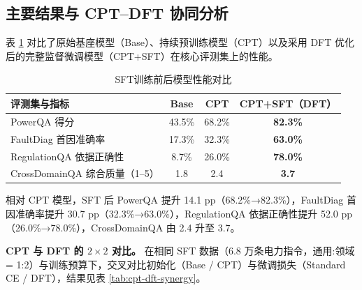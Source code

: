 \documentclass[fontset=fandol,type=master,campus=shenzhen,etitleauto=true]{hithesisbook}
\begin{document}
\subsection{主要结果与 CPT--DFT 协同分析}\label{ux4e3bux8981ux7ed3ux679c-2}

表 \ref{tab:sft-results} 对比了原始基座模型（Base）、持续预训练模型（CPT）以及采用 DFT 优化后的完整监督微调模型（CPT+SFT）在核心评测集上的性能。

\begin{table}[htbp]
\centering
\caption{SFT训练前后模型性能对比}
\label{tab:sft-results}
\small
\begin{tabular}{l c c c}
\toprule
\textbf{评测集与指标} & \textbf{Base} & \textbf{CPT} & \textbf{CPT+SFT（DFT）} \\
\midrule
PowerQA 得分 & 43.5\% & 68.2\% & \textbf{82.3\%} \\
FaultDiag 首因准确率 & 17.3\% & 32.3\% & \textbf{63.0\%} \\
RegulationQA 依据正确性 & 8.7\% & 26.0\% & \textbf{78.0\%} \\
CrossDomainQA 综合质量（1--5） & 1.8 & 2.4 & \textbf{3.7} \\
\bottomrule
\end{tabular}
\end{table}

相对 CPT 模型，SFT 后 PowerQA 提升 14.1 pp（68.2\%→82.3\%），FaultDiag 首因准确率提升 30.7 pp（32.3\%→63.0\%），RegulationQA 依据正确性提升 52.0 pp（26.0\%→78.0\%），CrossDomainQA 由 2.4 升至 3.7。

\textbf{CPT 与 DFT 的 $2 \times 2$ 对比。} 在相同 SFT 数据（6.8 万条电力指令，通用:领域 = 1:2）与训练预算下，交叉对比初始化（Base / CPT）与微调损失（Standard CE / DFT），结果见表 \ref{tab:cpt-dft-synergy}。

\begin{table}[htbp]
\centering
\caption{初始化基座（Base vs.\ CPT）与微调目标（Standard CE vs.\ DFT）的 $2 \times 2$ 对比结果}
\label{tab:cpt-dft-synergy}
\small
\setlength{\tabcolsep}{4pt}
\renewcommand{\arraystretch}{1.15}
\end{table}
\end{document}
